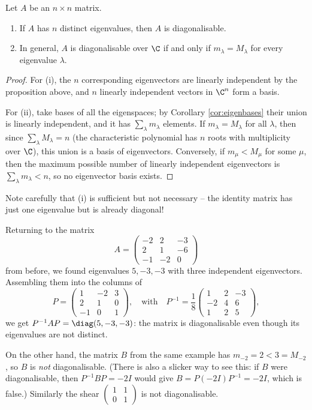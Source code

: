 \begin{theorem}
	Let $A$ be an $n \times n$ matrix.
	\begin{enumerate}[label=(\roman*)]
		\item If $A$ has $n$ distinct eigenvalues, then $A$ is diagonalisable.
		\item In general, $A$ is diagonalisable over $\C$ if and only if $m_\lambda = M_\lambda$ for every eigenvalue $\lambda$.
	\end{enumerate}
\end{theorem}
\begin{proof}
	For (i), the $n$ corresponding eigenvectors are linearly independent by the proposition above, and $n$ linearly independent vectors in $\C^n$ form a basis.

	For (ii), take bases of all the eigenspaces; by Corollary \ref{cor:eigenbases} their union is linearly independent, and it has $\sum_\lambda m_\lambda$ elements. If $m_\lambda = M_\lambda$ for all $\lambda$, then since $\sum_\lambda M_\lambda = n$ (the characteristic polynomial has $n$ roots with multiplicity over $\C$), this union is a basis of eigenvectors. Conversely, if $m_\mu < M_\mu$ for some $\mu$, then the maximum possible number of linearly independent eigenvectors is $\sum_\lambda m_\lambda < n$, so no eigenvector basis exists.
\end{proof}

Note carefully that (i) is sufficient but not necessary -- the identity matrix has just one eigenvalue but is already diagonal!

\begin{example}
	Returning to the matrix
	$$
	A = \begin{pmatrix}
		-2 & 2 & -3 \\ 2 & 1 & -6 \\ -1 & -2 & 0
	\end{pmatrix}
	$$
	from before, we found eigenvalues $5, -3, -3$ with three independent eigenvectors. Assembling them into the columns of
	$$
	P = \begin{pmatrix}
		1 & -2 & 3 \\
		2 & 1 & 0 \\
		-1 & 0 & 1
	\end{pmatrix}, \quad \text{with} \quad
	P^{-1} = \frac{1}{8}\begin{pmatrix}
		1 & 2 & -3 \\
		-2 & 4 & 6 \\
		1 & 2 & 5
	\end{pmatrix},
	$$
	we get $P^{-1}AP = \diag(5, -3, -3)$: the matrix is diagonalisable even though its eigenvalues are not distinct.

	On the other hand, the matrix $B$ from the same example has $m_{-2} = 2 < 3 = M_{-2}$, so $B$ is \emph{not} diagonalisable. (There is also a slicker way to see this: if $B$ were diagonalisable, then $P^{-1}BP = -2I$ would give $B = P(-2I)P^{-1} = -2I$, which is false.) Similarly the shear $\begin{pmatrix} 1 & 1 \\ 0 & 1 \end{pmatrix}$ is not diagonalisable.
\end{example}

